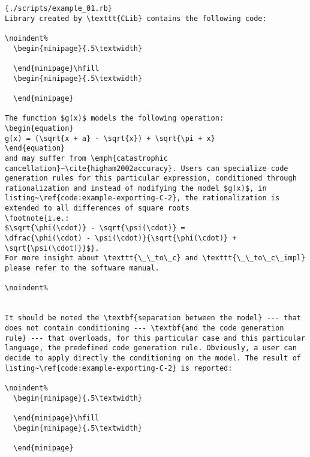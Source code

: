 \begin{lstlisting}[caption={Calling optimized-C exporter for library generation},label={code:example-exporting-C-1}]{./scripts/example_01.rb}
Library created by \texttt{CLib} contains the following code:

\noindent%
  \begin{minipage}{.5\textwidth}
    
  \end{minipage}\hfill
  \begin{minipage}{.5\textwidth}
    
  \end{minipage}

The function $g(x)$ models the following operation:
\begin{equation}
g(x) = (\sqrt{x + a} - \sqrt{x}) + \sqrt{\pi + x}
\end{equation}
and may suffer from \emph{catastrophic cancellation}~\cite{higham2002accuracy}. Users can specialize code generation rules for this particular expression, conditioned through rationalization and instead of modifying the model $g(x)$, in listing~\ref{code:example-exporting-C-2}, the rationalization is extended to all differences of square roots
\footnote{i.e.:
$\sqrt{\phi(\cdot)} - \sqrt{\psi(\cdot)} =
\dfrac{\phi(\cdot) - \psi(\cdot)}{\sqrt{\phi(\cdot)} + \sqrt{\psi(\cdot)}}$}.
For more insight about \texttt{\_\_to\_c} and \texttt{\_\_to\_c\_impl} please refer to the software manual.

\noindent%


It should be noted the \textbf{separation between the model} --- that does not contain conditioning --- \textbf{and the code generation rule} --- that overloads, for this particular case and this particular language, the predefined code generation rule. Obviously, a user can decide to apply directly the conditioning on the model. The result of listing~\ref{code:example-exporting-C-2} is reported:

\noindent%
  \begin{minipage}{.5\textwidth}
    
  \end{minipage}\hfill
  \begin{minipage}{.5\textwidth}
    
  \end{minipage}


\end{lstlisting}
